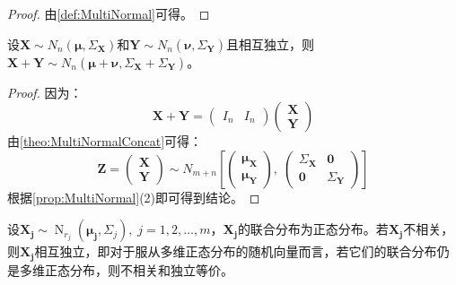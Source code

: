 \begin{proof}
	由\cref{def:MultiNormal}可得。
\end{proof}
\begin{theorem}\label{theo:MultiNormalAdditivity}
	设$\mathbf{X}\sim N_n(\boldsymbol{\mu},\Sigma_\mathbf{X})$和$\mathbf{Y}\sim N_n(\boldsymbol{\nu},\Sigma_\mathbf{Y})$且相互独立，则$\mathbf{X}+\mathbf{Y}\sim N_n(\boldsymbol{\mu}+\boldsymbol{\nu},\Sigma_\mathbf{X}+\Sigma_\mathbf{Y})$。
\end{theorem}
\begin{proof}
	因为：
	\begin{equation*}
		\mathbf{X}+\mathbf{Y}=
		\begin{pmatrix}
			I_n & I_n
		\end{pmatrix}
		\begin{pmatrix}
			\mathbf{X} \\
			\mathbf{Y}
		\end{pmatrix}
	\end{equation*}
	由\cref{theo:MultiNormalConcat}可得：
	\begin{equation*}
		\mathbf{Z}=
		\begin{pmatrix}
			\mathbf{X} \\
			\mathbf{Y}
		\end{pmatrix}
		\sim N_{m+n}\left[
		\begin{pmatrix}
			\boldsymbol{\mu}_{\mathbf{X}} \\
			\boldsymbol{\mu}_{\mathbf{Y}}
		\end{pmatrix},\;
		\begin{pmatrix}
			\Sigma_\mathbf{X} & \mathbf{0} \\
			\mathbf{0} & \Sigma_\mathbf{Y}
		\end{pmatrix}
		\right]
	\end{equation*}
	根据\cref{prop:MultiNormal}(2)即可得到结论。
\end{proof}
\begin{theorem}\label{theo:IndependentCorrelationNormal}
	设$\mathbf{X_j}\sim\operatorname{N}_{r_j}(\boldsymbol{\mu_j},\Sigma_{j}),\;j=1,2,\dots,m$，$\mathbf{X_j}$的联合分布为正态分布。若$\mathbf{X_j}$不相关，则$\mathbf{X_j}$相互独立，即对于服从多维正态分布的随机向量而言，若它们的联合分布仍是多维正态分布，则不相关和独立等价。
\end{theorem}
